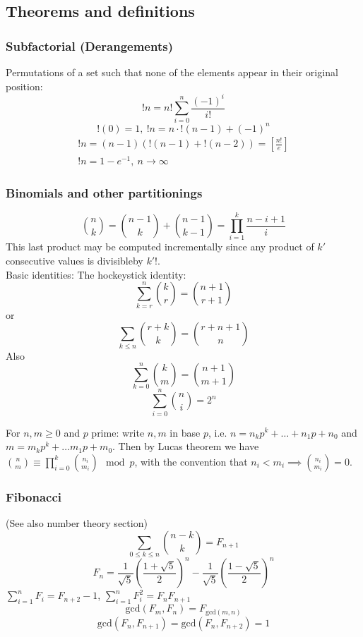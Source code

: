 \documentclass[
	a4paper,
	landscape,
	10pt,
]{article}
\begin{document}
\begin{multicols}{3}

	\subsection{Theorems and definitions}
		\subsubsection*{Subfactorial (Derangements)}
		Permutations of a set such that none of the elements appear in
		their original position:
		$$!n = n! \sum_{i=0}^{n} \frac{(-1)^i}{i!}$$
		$$!(0) = 1, ~ !n = n \cdot !(n-1) + (-1)^n$$
		\begin{gather}
			!n = (n-1)(!(n-1)+!(n-2)) = \left[\frac{n!}{e}\right] \\
			!n = 1-e^{-1},~n\rightarrow\infty
		\end{gather}

		\subsubsection*{Binomials and other partitionings}
		$$\binom{n}{k} = \binom{n-1}{k}+\binom{n-1}{k-1} =
			\prod_{i=1}^k \frac{n-i+1}{i}$$ This last product may be computed
		incrementally since any product of $k'$ consecutive values is divisibleby
		$k'!$. \\
		Basic identities: The hockeystick identity: \\
		 $$\sum_{k=r}^n \binom{k}{r}
			= \binom{n+1}{r+1}$$
		or $$\sum_{k\leq n}\binom{r+k}{k} = \binom{r+n+1}{n}$$
		Also $$\sum_{k=0}^n \binom{k}{m} = \binom{n+1}{m+1}$$
		$$\sum_{i=0}^{n} \binom{n}{i} = 2^n$$

		For $n, m \geq 0$ and $p$ prime: write $n, m$ in base $p$, i.e.
		$n = n_k p^k + \dots + n_1 p + n_0$ and $m = m_k p^k + \dots m_1 p + m_0$. Then
		by Lucas theorem we have $\binom{n}{m} \equiv \prod_{i=0}^k \binom{n_i}{m_i}
		\mod p$, with the convention that $n_i < m_i \implies \binom{n_i}{m_i} =0$.

		\subsubsection*{Fibonacci} (See also number theory section) \\
 		$$\sum_{0 \leq k \leq n} \binom{n-k}{k} = F_{n+1}$$ 
		$$F_n = \frac{1}{\sqrt{5}} \left(\frac{1+\sqrt{5}}{2}\right)^n - \frac{1}{\sqrt{5}}\left(\frac{1-\sqrt{5}}{2}\right)^n$$
		$\sum_{i=1}^{n} {F_i} = F_{n+2}-1$, $\sum_{i=1}^{n} {F_i^2} = F_{n}F_{n+1}$
		$$\text{gcd}(F_m, F_n) = F_{\text{gcd}(m, n)}$$
		$$\text{gcd}(F_n, F_{n+1}) = \text{gcd}(F_n, F_{n+2}) = 1$$


\end{multicols}
\end{document}

